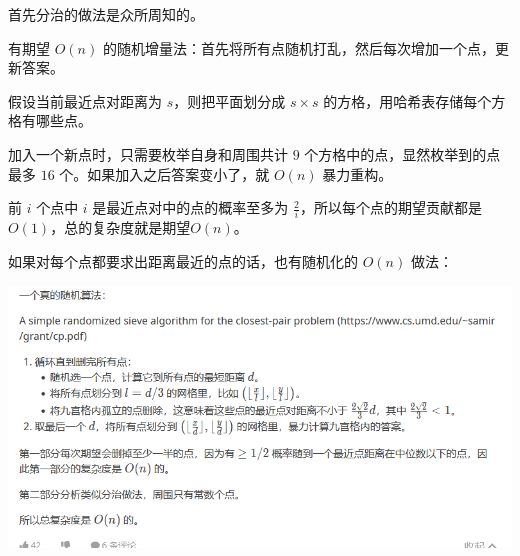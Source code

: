 首先分治的做法是众所周知的。

有期望 $O(n)$ 的随机增量法：首先将所有点随机打乱，然后每次增加一个点，更新答案。

假设当前最近点对距离为 $s$，则把平面划分成 $s \times s$ 的方格，用哈希表存储每个方格有哪些点。

加入一个新点时，只需要枚举自身和周围共计 $9$ 个方格中的点，显然枚举到的点最多 $16$ 个。如果加入之后答案变小了，就 $O(n)$ 暴力重构。

前 $i$ 个点中 $i$ 是最近点对中的点的概率至多为 $\frac 2 i$，所以每个点的期望贡献都是 $O(1)$，总的复杂度就是期望$O(n)$。

如果对每个点都要求出距离最近的点的话，也有随机化的 $O(n)$ 做法：

\includegraphics[width=0.8\linewidth]{../src/geometry/最近点对.png}
